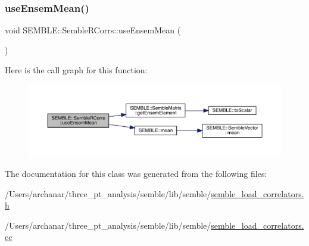 \subsubsection{\texorpdfstring{useEnsemMean()}{useEnsemMean()}}
{\footnotesize\ttfamily void S\+E\+M\+B\+L\+E\+::\+Semble\+R\+Corrs\+::use\+Ensem\+Mean (\begin{DoxyParamCaption}{ }\end{DoxyParamCaption})}

Here is the call graph for this function\+:
\nopagebreak
\begin{figure}[H]
\begin{center}
\leavevmode
\includegraphics[width=350pt]{d4/d78/classSEMBLE_1_1SembleRCorrs_ab8d8237902ed16cacac1910994db717b_cgraph}
\end{center}
\end{figure}


The documentation for this class was generated from the following files\+:\begin{DoxyCompactItemize}
\item 
/\+Users/archanar/three\+\_\+pt\+\_\+analysis/semble/lib/semble/\mbox{\hyperlink{semble__load__correlators_8h}{semble\+\_\+load\+\_\+correlators.\+h}}\item 
/\+Users/archanar/three\+\_\+pt\+\_\+analysis/semble/lib/semble/\mbox{\hyperlink{semble__load__correlators_8cc}{semble\+\_\+load\+\_\+correlators.\+cc}}\end{DoxyCompactItemize}
